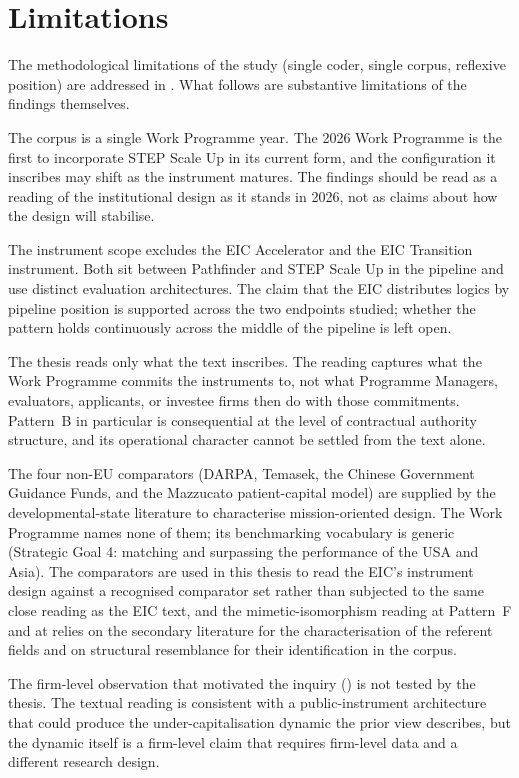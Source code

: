 \section{Limitations}
\label{sec:conc-limits}

The methodological limitations of the study (single coder, single
corpus, reflexive position) are addressed in .
What follows are substantive limitations of the findings themselves.

The corpus is a single Work Programme year. The 2026 Work Programme is
the first to incorporate STEP Scale Up in its current form, and the
configuration it inscribes may shift as the instrument matures. The
findings should be read as a reading of the institutional design as it
stands in 2026, not as claims about how the design will stabilise.

The instrument scope excludes the EIC Accelerator and the EIC
Transition instrument. Both sit between Pathfinder and STEP Scale Up in
the pipeline and use distinct evaluation architectures. The claim that
the EIC distributes logics by pipeline position is supported across the
two endpoints studied; whether the pattern holds continuously across
the middle of the pipeline is left open.

The thesis reads only what the text inscribes. The reading captures
what the Work Programme commits the instruments to, not what Programme
Managers, evaluators, applicants, or investee firms then do with those
commitments. Pattern~B in particular is consequential at the level of
contractual authority structure, and its operational character cannot
be settled from the text alone.

The four non-EU comparators (DARPA, Temasek, the Chinese Government
Guidance Funds, and the Mazzucato patient-capital model) are supplied
by the developmental-state literature to characterise
mission-oriented design. The Work Programme names none of them; its
benchmarking vocabulary is generic (Strategic Goal 4: matching and
surpassing the performance of the USA and Asia). The comparators are
used in this thesis to read the EIC's instrument design against a
recognised comparator set rather than subjected to the same close
reading as the EIC text, and the mimetic-isomorphism reading at
Pattern~F and at  relies on the secondary
literature for the characterisation of the referent fields and on
structural resemblance for their identification in the corpus.

The firm-level observation that motivated the inquiry
() is not tested by the thesis. The textual
reading is consistent with a public-instrument architecture that could
produce the under-capitalisation dynamic the prior view describes, but
the dynamic itself is a firm-level claim that requires firm-level data
and a different research design.

